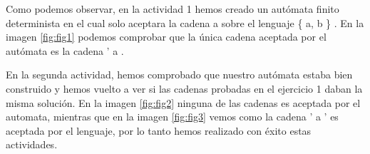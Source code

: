 \documentclass[titlepage,12pt]{article}
\begin{document}
Como podemos observar, en la actividad 1 hemos creado un autómata finito determinista en el cual solo aceptara la cadena a sobre el lenguaje \{ a, b \} . En la imagen \ref{fig:fig1} podemos comprobar que la única cadena aceptada por el autómata es la cadena ' a .

En la segunda actividad, hemos comprobado que nuestro autómata estaba bien construido y hemos vuelto a ver si las cadenas probadas en el ejercicio 1 daban la misma solución.
En la imagen \ref{fig:fig2} ninguna de las cadenas es aceptada por el automata, mientras que en la imagen \ref{fig:fig3} vemos como la cadena ' a ' es aceptada por el lenguaje, por lo tanto hemos realizado con éxito estas actividades.
\end{document}
